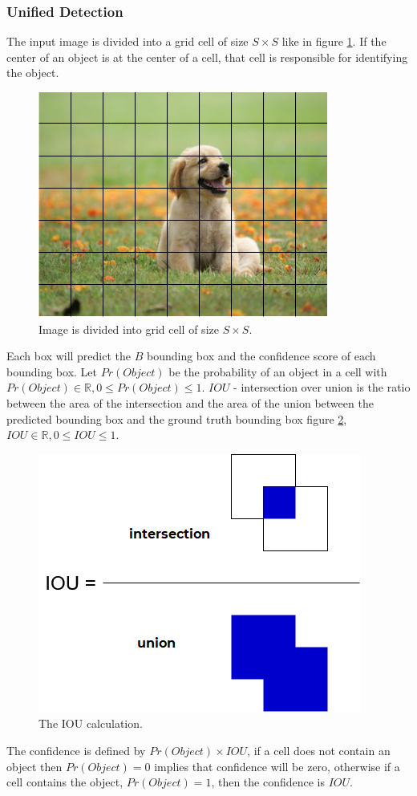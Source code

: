 \documentclass[conference]{IEEEtran}
\begin{document}
\subsubsection{Unified Detection}
The input image is divided into a grid cell of size $ S \times S $ like in figure \ref{fig:grid_cell}. If the center of an object is at the center of a cell, that cell is responsible for identifying the object.
\begin{figure}[ht]
	\centerline{\includegraphics[scale=0.6]{images/grid_cell.png}}
  	\caption{Image is divided into grid cell of size $ S \times S $.}
  	\label{fig:grid_cell}
\end{figure}
Each box will predict the $ B $ bounding box and the confidence score of each bounding box. Let $ Pr(Object) $ be the probability of an object in a cell with $ Pr(Object) \in \mathbb {R}, 0 \leq Pr(Object) \leq 1 $. $ IOU $ - intersection over union is the ratio between the area of the intersection and the area of the union between the predicted bounding box and the ground truth bounding box figure \ref{fig:iou}, $ IOU \in \mathbb {R}, 0 \leq IOU \leq 1 $.
\begin{figure}[ht]
	\centerline{\includegraphics[scale=0.5]{images/iou.png}}
  	\caption{The IOU calculation.}
  	\label{fig:iou}
\end{figure}
The confidence is defined by $ Pr(Object) \times IOU $, if a cell does not contain an object then $ Pr(Object) = 0 $ implies that confidence will be zero, otherwise if a cell contains the object, $ Pr (Object) = 1 $, then the confidence is $ IOU $.
\end{document}
